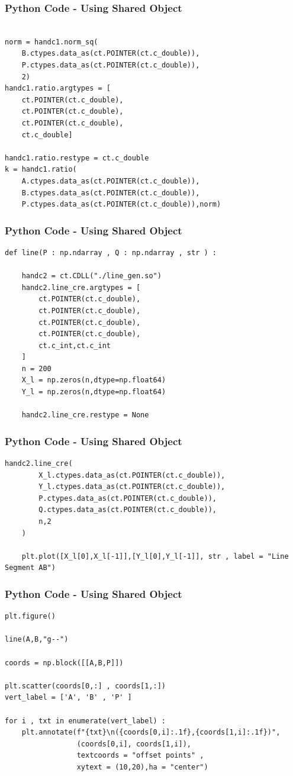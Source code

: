 \documentclass{beamer}
\begin{document}
\begin{frame}[fragile]
    \frametitle{Python Code - Using Shared Object}
    \begin{lstlisting}

norm = handc1.norm_sq(
    B.ctypes.data_as(ct.POINTER(ct.c_double)),
    P.ctypes.data_as(ct.POINTER(ct.c_double)),
    2)
handc1.ratio.argtypes = [
    ct.POINTER(ct.c_double),
    ct.POINTER(ct.c_double),
    ct.POINTER(ct.c_double),
    ct.c_double]
    
handc1.ratio.restype = ct.c_double
k = handc1.ratio(
    A.ctypes.data_as(ct.POINTER(ct.c_double)),
    B.ctypes.data_as(ct.POINTER(ct.c_double)),
    P.ctypes.data_as(ct.POINTER(ct.c_double)),norm)

\end{lstlisting}
\end{frame}

\begin{frame}[fragile]
    \frametitle{Python Code - Using Shared Object}
    \begin{lstlisting}
def line(P : np.ndarray , Q : np.ndarray , str ) :

    handc2 = ct.CDLL("./line_gen.so")
    handc2.line_cre.argtypes = [
        ct.POINTER(ct.c_double),
        ct.POINTER(ct.c_double),
        ct.POINTER(ct.c_double),
        ct.POINTER(ct.c_double),
        ct.c_int,ct.c_int
    ]
    n = 200
    X_l = np.zeros(n,dtype=np.float64)
    Y_l = np.zeros(n,dtype=np.float64)

    handc2.line_cre.restype = None
\end{lstlisting}
\end{frame}
\begin{frame}[fragile]
    \frametitle{Python Code - Using Shared Object}
    \begin{lstlisting}
handc2.line_cre(
        X_l.ctypes.data_as(ct.POINTER(ct.c_double)),
        Y_l.ctypes.data_as(ct.POINTER(ct.c_double)),
        P.ctypes.data_as(ct.POINTER(ct.c_double)),
        Q.ctypes.data_as(ct.POINTER(ct.c_double)),
        n,2
    )

    plt.plot([X_l[0],X_l[-1]],[Y_l[0],Y_l[-1]], str , label = "Line Segment AB")
    \end{lstlisting}
\end{frame}

\begin{frame}[fragile]
    \frametitle{Python Code - Using Shared Object}
    \begin{lstlisting}
plt.figure()

line(A,B,"g--")

coords = np.block([[A,B,P]])

plt.scatter(coords[0,:] , coords[1,:])
vert_label = ['A', 'B' , 'P' ]

for i , txt in enumerate(vert_label) :
    plt.annotate(f"{txt}\n({coords[0,i]:.1f},{coords[1,i]:.1f})",
                 (coords[0,i], coords[1,i]),
                 textcoords = "offset points" ,
                 xytext = (10,20),ha = "center")
\end{lstlisting}
\end{frame}
\end{document}
